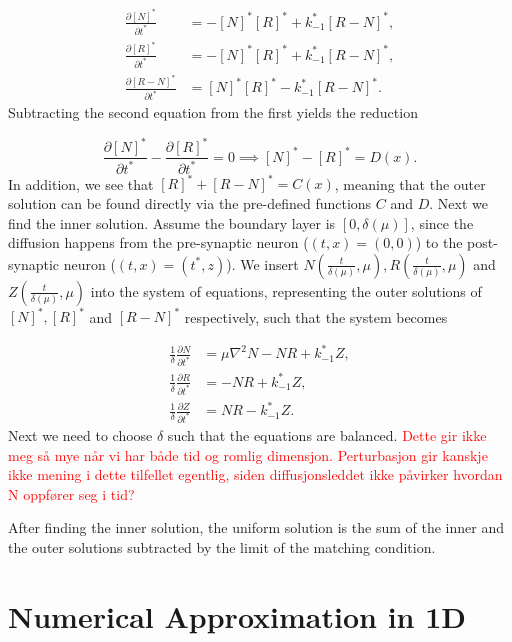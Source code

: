 \documentclass{article}
\begin{document}
\begin{align}
    \frac{\partial [N]^*}{\partial t^*} &= - [N]^*[R]^* + k_{-1}^*[R-N]^*,\\
    \frac{\partial [R]^*}{\partial t^*} &= - [N]^*[R]^* + k_{-1}^*[R-N]^*,\\
    \frac{\partial [R-N]^*}{\partial t^*} &= [N]^*[R]^* - k_{-1}^*[R-N]^*.
\end{align}
Subtracting the second equation from the first yields the reduction

\begin{equation}
    \frac{\partial [N]^*}{\partial t^*} - \frac{\partial [R]^*}{\partial t^*} = 0 \implies [N]^* - [R]^* = D(x).
\end{equation}
In addition, we see that $[R]^* + [R-N]^* = C(x)$, meaning that the outer solution can be found directly via the pre-defined functions $C$ and $D$. Next we find the inner solution. Assume the boundary layer is $[0,\delta(\mu)]$, since the diffusion happens from the pre-synaptic neuron ($(t,x) = (0,0)$) to the post-synaptic neuron ($(t,x) = (t^*,z)$). We insert $N(\frac{t}{\delta(\mu)},\mu), R(\frac{t}{\delta(\mu)},\mu)$ and $Z(\frac{t}{\delta(\mu)},\mu)$ into the system of equations, representing the outer solutions of $[N]^*, [R]^*$ and $[R-N]^*$ respectively, such that the system becomes 

\begin{align}
    \frac{1}{\delta}\frac{\partial N}{\partial t^*} &= \mu\nabla^2N- NR + k_{-1}^*Z,\\
    \frac{1}{\delta}\frac{\partial R}{\partial t^*} &= - NR + k_{-1}^*Z  ,\\
    \frac{1}{\delta}\frac{\partial Z}{\partial t^*} &= NR - k_{-1}^*Z.
\end{align}
Next we need to choose $\delta$ such that the equations are balanced. \textcolor{red}{Dette gir ikke meg så mye når vi har både tid og romlig dimensjon. Perturbasjon gir kanskje ikke mening i dette tilfellet egentlig, siden diffusjonsleddet ikke påvirker hvordan N oppfører seg i tid?}

After finding the inner solution, the uniform solution is the sum of the inner and the outer solutions subtracted by the limit of the matching condition. 

\section{Numerical Approximation in 1D}
\end{document}
